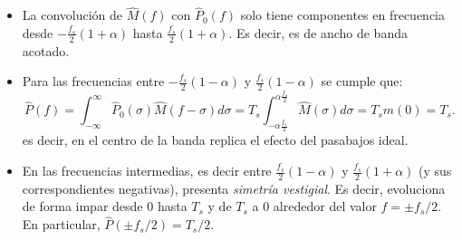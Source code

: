 \begin{itemize}
    \item La convolución de $\hat{M}(f)$ con $\hat{P}_0(f)$ solo tiene componentes en frecuencia desde $-\frac{f_s}{2}(1+\alpha)$ hasta $\frac{f_s}{2}(1+\alpha)$. Es decir, es de ancho de banda acotado.
    \item Para las frecuencias entre $-\frac{f_s}{2}(1-\alpha)$ y $\frac{f_s}{2}(1-\alpha)$ se cumple que:
        \begin{equation*}
            \hat{P}(f) = \int_{-\infty}^\infty \hat{P}_0(\sigma) \hat{M}(f-\sigma) d\sigma = T_s \int_{-\alpha\frac{f_s}{2}}^{\alpha \frac{f_s}{2}} \hat{M}(\sigma)d\sigma = T_s m(0) = T_s.
        \end{equation*}
    es decir, en el centro de la banda replica el efecto del pasabajos ideal.
    \item En las frecuencias intermedias, es decir entre $\frac{f_s}{2}(1-\alpha)$ y $\frac{f_s}{2}(1+\alpha)$ (y sus correspondientes negativas), presenta \emph{simetría vestigial}. Es decir, evoluciona de forma impar desde $0$ hasta $T_s$ y de $T_s$ a $0$ alrededor del valor $f=\pm f_s/2$. En particular, $\hat{P}(\pm f_s/2) = T_s/2$.
\end{itemize}

